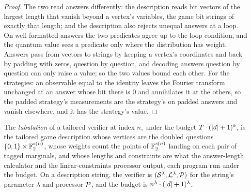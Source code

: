 \begin{proof}
\leanok
The two read answers differently: the description reads bit vectors of the largest length that
vanish beyond a vertex's variables, the game bit strings of exactly that length; and the
description also rejects unequal answers at a loop. On well-formatted answers the two
predicates agree up to the loop condition, and the quantum value sees a predicate only where the
distribution has weight. Answers pass from vectors to strings by keeping a vertex's
coordinates and back by padding with zeros, question by question, and decoding answers question
by question can only raise a value; so the two values bound each other. For the strategies: an
observable equal to the identity leaves the Fourier transform unchanged at an answer whose bit
there is $0$ and annihilates it at the others, so the padded strategy's measurements are the
strategy's on padded answers and vanish elsewhere, and it has the strategy's value.
\end{proof}

\begin{definition}
\label{def:tailored-tabulation}
\leanok
The \emph{tabulation} of a tailored verifier at index $n$, under the budget
$T \cdot (\abs{d} + 1)^k$, is the tailored game description whose vertices are the doubled
questions $\{0, 1\} \times \F_2^{s(n)}$, whose weights count the points of $\F_2^{s(n)}$ landing
on each pair of tagged marginals, and whose lengths and constraints are what the answer-length
calculator and the linear-constraints processor output, each program run under the budget. On a
description string, the verifier is $(\cal{S}^\lambda, \cal{L}^\lambda, \cal{P})$ for the string's
parameter $\lambda$ and processor $\cal{P}$, and the budget is $n^\lambda \cdot
(\abs{d}+1)^\lambda$.
\end{definition}

